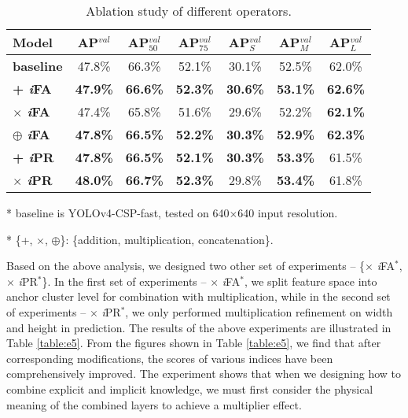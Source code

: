 \documentclass[10pt,twocolumn,letterpaper]{article}
\begin{document}
\begin{table}[h]
	\centering
	\begin{threeparttable}[h]
		\footnotesize
		\caption{Ablation study of different operators.}
		\label{table:e4}
		\setlength\tabcolsep{4.5pt}
		\begin{tabular}{lcccccc}
			\toprule
			\textbf{Model} & \textbf{AP$^{val}$} & \textbf{AP$^{val}_{50}$} & \textbf{AP$^{val}_{75}$} & \textbf{AP$^{val}_{S}$} & \textbf{AP$^{val}_{M}$} & \textbf{AP$^{val}_{L}$} \\				
			\midrule
			\textbf{baseline} & 47.8\% & 66.3\% & 52.1\% & 30.1\% & 52.5\% & 62.0\% \\				
			\midrule
			\textbf{+ \textit{i}FA} & \textbf{47.9\%} & \textbf{66.6\%} & \textbf{52.3\%} & \textbf{30.6\%} & \textbf{53.1\%} & \textbf{62.6\%} \\
			\textbf{$\times$ \textit{i}FA} & 47.4\% & 65.8\% & 51.6\% & 29.6\% & 52.2\% & \textbf{62.1\%} \\
			\textbf{$\oplus$ \textit{i}FA} & \textbf{47.8\%} & \textbf{66.5\%} & \textbf{52.2\%} & \textbf{30.3\%} & \textbf{52.9\%} & \textbf{62.3\%} \\
			\midrule
			\textbf{+ \textit{i}PR} & \textbf{47.8\%} & \textbf{66.5\%} & \textbf{52.1\%} & \textbf{30.3\%} & \textbf{53.3\%} & 61.5\% \\
			\textbf{$\times$ \textit{i}PR} & \textbf{48.0\%} & \textbf{66.7\%} & \textbf{52.3\%} & 29.8\% & \textbf{53.4\%} & 61.8\% \\
			\bottomrule
		\end{tabular}
		\begin{tablenotes}[flushleft]
			\footnotesize
			\item[*] baseline is YOLOv4-CSP-fast, tested on 640$\times$640 input resolution.
			\item[*] \{+, $\times$, $\oplus$\}: \{addition, multiplication, concatenation\}.
		\end{tablenotes}
	\end{threeparttable}
\end{table}

Based on the above analysis, we designed two other set of experiments -- \{$\times$ \textit{i}FA$^{*}$, $\times$ \textit{i}PR$^{*}$\}. In the first set of experiments -- $\times$ \textit{i}FA$^{*}$, we split feature space into anchor cluster level for combination with multiplication, while in the second set of experiments -- $\times$ \textit{i}PR$^{*}$, we only performed multiplication refinement on width and height in prediction. The results of the above experiments are illustrated in Table \ref{table:e5}. From the figures shown in Table \ref{table:e5}, we find that after corresponding modifications, the scores of various indices have been comprehensively improved. The experiment shows that when we designing how to combine explicit and implicit knowledge, we must first consider the physical meaning of the combined layers to achieve a multiplier effect.
\end{document}
